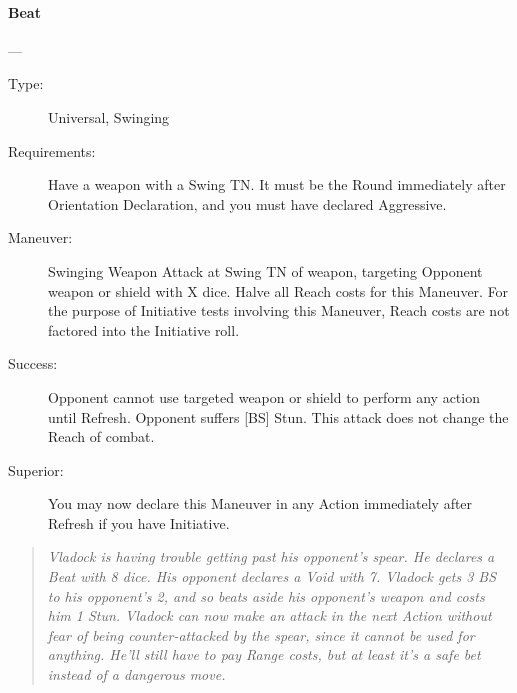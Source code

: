 \documentclass[oneside,11pt,english]{book}
\begin{document}
\paragraph{\large Beat \label{man:Beat}}---\quad{\large[X]}
\vspace{-10pt}\begin{description}
\item [Type:] Universal, Swinging
\item [Requirements:] Have a weapon with a Swing TN. It must be the Round
  immediately after Orientation Declaration, and you must have declared
  Aggressive. 
\item [Maneuver:] Swinging Weapon Attack at Swing TN of weapon, targeting
  Opponent weapon or shield with X dice. Halve all Reach costs for this
  Maneuver. For the purpose of Initiative tests involving this Maneuver, Reach
  costs are not factored into the Initiative roll.  
\item [Success:] Opponent cannot use targeted weapon or shield to perform any
  action until Refresh. Opponent suffers [BS] Stun. This attack does not change
  the Reach of combat.  
\item [Superior:] You may now declare this Maneuver in any Action immediately after Refresh if you have Initiative. 
\end{description}
\begin{quotation}
  \emph{Vladock is having trouble getting past his opponent’s spear. He declares
    a Beat with 8 dice. His opponent declares a Void with 7. Vladock gets 3 BS
    to his opponent’s 2, and so beats aside his opponent’s weapon and costs him
    1 Stun. Vladock can now make an attack in the next Action without fear of
    being counter-attacked by the spear, since it cannot be used for anything.
    He’ll still have to pay Range costs, but at least it’s a safe bet instead of
    a dangerous move. } 
\end{quotation}
\end{document}
